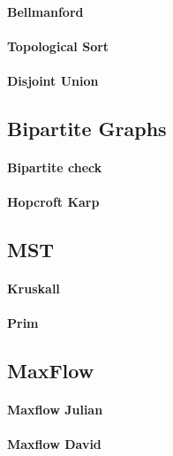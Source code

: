 \documentclass[a4paper]{article}
\begin{document}
\paragraph{Bellmanford} \hfill

\paragraph{Topological Sort} \hfill

\paragraph{Disjoint Union} \hfill

\subsection{Bipartite Graphs}
\paragraph{Bipartite check} \hfill

\paragraph{Hopcroft Karp} \hfill

\subsection{MST}
\paragraph{Kruskall} \hfill

\paragraph{Prim} \hfill

\subsection{MaxFlow}
\paragraph{Maxflow Julian} \hfill

\paragraph{Maxflow David} \hfill

\end{document}
